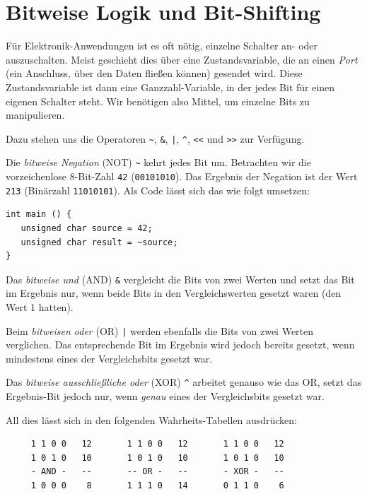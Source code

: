 \section{Bitweise Logik und Bit-Shifting} \label{sec:BitwiseOperator}
Für Elektronik-Anwendungen ist es oft nötig, einzelne Schalter an- oder auszuschalten. Meist geschieht dies über eine Zustandsvariable, die an einen \emph{Port} (ein Anschluss, über den Daten fließen können) gesendet wird. Diese Zustandsvariable ist dann \idR eine Ganzzahl-Variable, in der jedes Bit für einen eigenen Schalter steht. Wir benötigen also Mittel, um einzelne Bits zu manipulieren.

Dazu stehen uns die Operatoren \texttt{\~}, \texttt{\&}, \texttt{|}, \texttt{\^}, \texttt{<{}<} und \texttt{>{}>} zur Verfügung.

Die \emph{bitweise Negation} (NOT) \texttt{\~} kehrt jedes Bit um. Betrachten wir die vorzeichenlose 8-Bit-Zahl \texttt{42} (\texttt{00101010}). Das Ergebnis der Negation ist der Wert \texttt{213} (Binärzahl \texttt{11010101}). Als Code lässt sich das wie folgt umsetzen:
\begin{codebox}
\begin{verbatim}
int main () {
   unsigned char source = 42;
   unsigned char result = ~source;
}
\end{verbatim}
\end{codebox}

Das \emph{bitweise und} (AND) \texttt{\&} vergleicht die Bits von zwei Werten und setzt das Bit im Ergebnis nur, wenn beide Bits in den Vergleichswerten gesetzt waren (\ie den Wert 1 hatten).

Beim \emph{bitweisen oder} (OR) \texttt{|} werden ebenfalls die Bits von zwei Werten verglichen. Das entsprechende Bit im Ergebnis wird jedoch bereits gesetzt, wenn mindestens eines der Vergleichsbits gesetzt war.

Das \emph{bitweise ausschließliche oder} (XOR) \texttt{\^} arbeitet genauso wie das OR, setzt das Ergebnis-Bit jedoch nur, wenn \emph{genau} eines der Vergleichsbits gesetzt war.

All dies lässt sich in den folgenden Wahrheits-Tabellen ausdrücken:
\begin{codebox}
\begin{verbatim}
     1 1 0 0   12       1 1 0 0   12       1 1 0 0   12
     1 0 1 0   10       1 0 1 0   10       1 0 1 0   10
     - AND -   --       -- OR -   --       - XOR -   --
     1 0 0 0    8       1 1 1 0   14       0 1 1 0    6
\end{verbatim}
\end{codebox}

